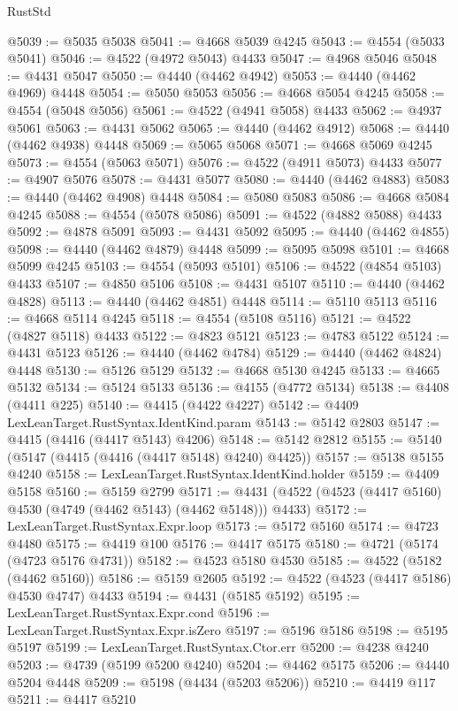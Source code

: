 \begin{lexlean}{RustStd}
\begin{coremodule}
@5039 := @5035 @5038
@5041 := @4668 @5039 @4245
@5043 := @4554 (@5033 @5041)
@5046 := @4522 (@4972 @5043) @4433
@5047 := @4968 @5046
@5048 := @4431 @5047
@5050 := @4440 (@4462 @4942)
@5053 := @4440 (@4462 @4969) @4448
@5054 := @5050 @5053
@5056 := @4668 @5054 @4245
@5058 := @4554 (@5048 @5056)
@5061 := @4522 (@4941 @5058) @4433
@5062 := @4937 @5061
@5063 := @4431 @5062
@5065 := @4440 (@4462 @4912)
@5068 := @4440 (@4462 @4938) @4448
@5069 := @5065 @5068
@5071 := @4668 @5069 @4245
@5073 := @4554 (@5063 @5071)
@5076 := @4522 (@4911 @5073) @4433
@5077 := @4907 @5076
@5078 := @4431 @5077
@5080 := @4440 (@4462 @4883)
@5083 := @4440 (@4462 @4908) @4448
@5084 := @5080 @5083
@5086 := @4668 @5084 @4245
@5088 := @4554 (@5078 @5086)
@5091 := @4522 (@4882 @5088) @4433
@5092 := @4878 @5091
@5093 := @4431 @5092
@5095 := @4440 (@4462 @4855)
@5098 := @4440 (@4462 @4879) @4448
@5099 := @5095 @5098
@5101 := @4668 @5099 @4245
@5103 := @4554 (@5093 @5101)
@5106 := @4522 (@4854 @5103) @4433
@5107 := @4850 @5106
@5108 := @4431 @5107
@5110 := @4440 (@4462 @4828)
@5113 := @4440 (@4462 @4851) @4448
@5114 := @5110 @5113
@5116 := @4668 @5114 @4245
@5118 := @4554 (@5108 @5116)
@5121 := @4522 (@4827 @5118) @4433
@5122 := @4823 @5121
@5123 := @4783 @5122
@5124 := @4431 @5123
@5126 := @4440 (@4462 @4784)
@5129 := @4440 (@4462 @4824) @4448
@5130 := @5126 @5129
@5132 := @4668 @5130 @4245
@5133 := @4665 @5132
@5134 := @5124 @5133
@5136 := @4155 (@4772 @5134)
@5138 := @4408 (@4411 @225)
@5140 := @4415 (@4422 @4227)
@5142 := @4409 LexLeanTarget.RustSyntax.IdentKind.param
@5143 := @5142 @2803
@5147 := @4415 (@4416 (@4417 @5143) @4206)
@5148 := @5142 @2812
@5155 := @5140 (@5147 (@4415 (@4416 (@4417 @5148) @4240) @4425))
@5157 := @5138 @5155 @4240
@5158 := LexLeanTarget.RustSyntax.IdentKind.holder
@5159 := @4409 @5158
@5160 := @5159 @2799
@5171 := @4431 (@4522 (@4523 (@4417 @5160) @4530 (@4749 (@4462 @5143) (@4462 @5148))) @4433)
@5172 := LexLeanTarget.RustSyntax.Expr.loop
@5173 := @5172 @5160
@5174 := @4723 @4480
@5175 := @4419 @100
@5176 := @4417 @5175
@5180 := @4721 (@5174 (@4723 @5176 @4731))
@5182 := @4523 @5180 @4530
@5185 := @4522 (@5182 (@4462 @5160))
@5186 := @5159 @2605
@5192 := @4522 (@4523 (@4417 @5186) @4530 @4747) @4433
@5194 := @4431 (@5185 @5192)
@5195 := LexLeanTarget.RustSyntax.Expr.cond
@5196 := LexLeanTarget.RustSyntax.Expr.isZero
@5197 := @5196 @5186
@5198 := @5195 @5197
@5199 := LexLeanTarget.RustSyntax.Ctor.err
@5200 := @4238 @4240
@5203 := @4739 (@5199 @5200 @4240)
@5204 := @4462 @5175
@5206 := @4440 @5204 @4448
@5209 := @5198 (@4434 (@5203 @5206))
@5210 := @4419 @117
@5211 := @4417 @5210

\end{coremodule}
\end{lexlean}
